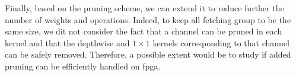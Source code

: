 Finally, based on the pruning scheme, we can extend it to reduce further the number of weights and operations. Indeed, to keep all fetching group to be the same size, we dit not consider the fact that a channel can be pruned in each kernel and that the depthwise and $1 \times 1$ kernels corresponding to that channel can be safely removed. Therefore, a possible extent would be to study if added pruning can be efficiently handled on \acrshort{fpga}.
\afterpage{\blankpage}
\newpage
